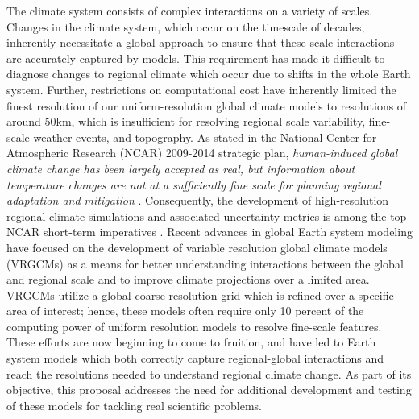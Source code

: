 \documentclass[11pt]{article}
\begin{document}
The climate system consists of complex interactions on a variety of scales. Changes in the climate system, which occur on the timescale of decades, inherently necessitate a global approach to ensure that these scale interactions are accurately captured by models. This requirement has made it difficult to diagnose changes to regional climate which occur due to shifts in the whole Earth system. Further, restrictions on computational cost have inherently limited the finest resolution of our uniform-resolution global climate models to resolutions of around 50km, which is insufficient for resolving regional scale variability, fine-scale weather events, and topography. As stated in the National Center for Atmospheric Research (NCAR) 2009-2014 strategic plan, \textit{human-induced global climate change has been largely accepted as real, but information about temperature changes are not at a sufficiently fine scale for planning regional adaptation and mitigation} \citep{NCAR2009}. Consequently, the development of high-resolution regional climate simulations and associated uncertainty metrics is among the top NCAR short-term imperatives \citep{NCAR2009}. Recent advances in global Earth system modeling have focused on the development of variable resolution global climate models (VRGCMs) as a means for better understanding interactions between the global and regional scale and to improve climate projections over a limited area.  VRGCMs utilize a global coarse resolution grid which is refined over a specific area of interest; hence, these models often require only 10 percent of the computing power of uniform resolution models to resolve fine-scale features. These efforts are now beginning to come to fruition, and have led to Earth system models which both correctly capture regional-global interactions and reach the resolutions needed to understand regional climate change.   As part of its objective, this proposal addresses the need for additional development and testing of these models for tackling real scientific problems.
\end{document}
